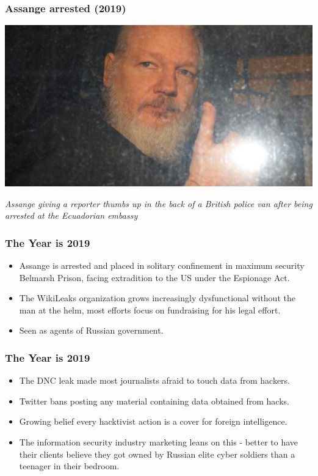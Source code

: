 \documentclass[aspectratio=169,usenames,dvipsnames]{beamer}
\begin{document}
\begin{frame}[c]
  \frametitle{Assange arrested (2019)}

  \centering
  \includegraphics[width=\textwidth,height=0.5\textheight,keepaspectratio]{img/assange_arrested.jpg}

  \vspace{5mm}

  \footnotesize
  \emph{Assange giving a reporter thumbs up in the back of a British police
  van after being arrested at the Ecuadorian embassy}

\end{frame}

\begin{frame}[c]
  \frametitle{The Year is 2019}

  \begin{itemize}[<+->]
    \item Assange is arrested and placed in solitary confinement in maximum
      security Belmarsh Prison, facing extradition to the US under the
      Espionage Act.
    \item The WikiLeaks organization grows increasingly dysfunctional without
      the man at the helm, most efforts focus on fundraising for his legal
      effort.
    \item Seen as agents of Russian government.
  \end{itemize}
\end{frame}

\begin{frame}[c]
  \frametitle{The Year is 2019}

  \begin{itemize}[<+->]
    \item The DNC leak made most journalists afraid to touch data from
      hackers.
    \item Twitter bans posting any material containing data obtained from
      hacks.
    \item Growing belief every hacktivist action is a cover for foreign
      intelligence.
    \item The information security industry marketing leans on this -
      better to have their clients believe they got owned by Russian elite
      cyber soldiers than a teenager in their bedroom.
  \end{itemize}
\end{frame}
\end{document}

